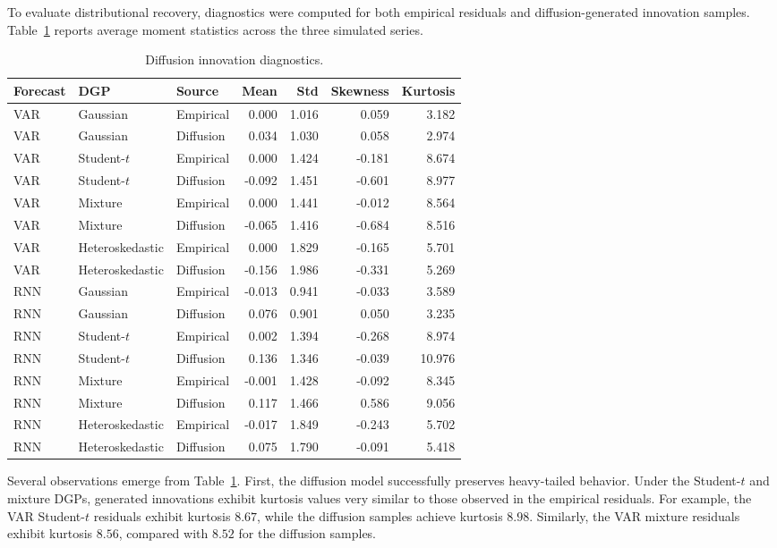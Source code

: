 \documentclass[11pt]{article}
\begin{document}
To evaluate distributional recovery, diagnostics were computed for both empirical residuals and diffusion-generated innovation samples. Table~\ref{tab:diffusion_diagnostics} reports average moment statistics across the three simulated series.

\begin{table}[H]
\centering
\caption{Diffusion innovation diagnostics.}
\label{tab:diffusion_diagnostics}
\small
\begin{tabular}{lllrrrr}
\toprule
Forecast & DGP & Source & Mean & Std & Skewness & Kurtosis \\
\midrule
VAR & Gaussian & Empirical & 0.000 & 1.016 & 0.059 & 3.182 \\
VAR & Gaussian & Diffusion & 0.034 & 1.030 & 0.058 & 2.974 \\
\midrule
VAR & Student-\(t\) & Empirical & 0.000 & 1.424 & -0.181 & 8.674 \\
VAR & Student-\(t\) & Diffusion & -0.092 & 1.451 & -0.601 & 8.977 \\
\midrule
VAR & Mixture & Empirical & 0.000 & 1.441 & -0.012 & 8.564 \\
VAR & Mixture & Diffusion & -0.065 & 1.416 & -0.684 & 8.516 \\
\midrule
VAR & Heteroskedastic & Empirical & 0.000 & 1.829 & -0.165 & 5.701 \\
VAR & Heteroskedastic & Diffusion & -0.156 & 1.986 & -0.331 & 5.269 \\
\midrule
RNN & Gaussian & Empirical & -0.013 & 0.941 & -0.033 & 3.589 \\
RNN & Gaussian & Diffusion & 0.076 & 0.901 & 0.050 & 3.235 \\
\midrule
RNN & Student-\(t\) & Empirical & 0.002 & 1.394 & -0.268 & 8.974 \\
RNN & Student-\(t\) & Diffusion & 0.136 & 1.346 & -0.039 & 10.976 \\
\midrule
RNN & Mixture & Empirical & -0.001 & 1.428 & -0.092 & 8.345 \\
RNN & Mixture & Diffusion & 0.117 & 1.466 & 0.586 & 9.056 \\
\midrule
RNN & Heteroskedastic & Empirical & -0.017 & 1.849 & -0.243 & 5.702 \\
RNN & Heteroskedastic & Diffusion & 0.075 & 1.790 & -0.091 & 5.418 \\
\bottomrule
\end{tabular}
\end{table}

Several observations emerge from Table~\ref{tab:diffusion_diagnostics}. First, the diffusion model successfully preserves heavy-tailed behavior. Under the Student-\(t\) and mixture DGPs, generated innovations exhibit kurtosis values very similar to those observed in the empirical residuals. For example, the VAR Student-\(t\) residuals exhibit kurtosis \(8.67\), while the diffusion samples achieve kurtosis \(8.98\). Similarly, the VAR mixture residuals exhibit kurtosis \(8.56\), compared with \(8.52\) for the diffusion samples.
\end{document}

